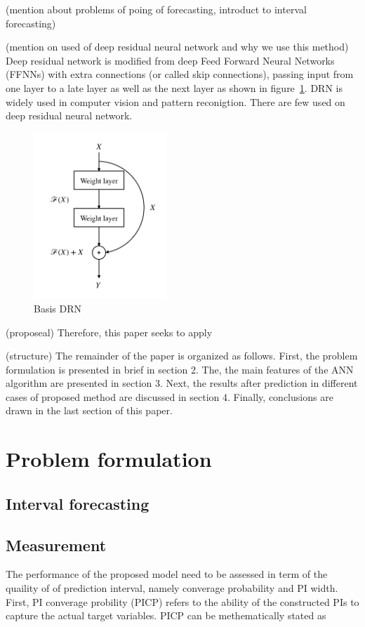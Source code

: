 \documentclass[review]{elsarticle}
\begin{document}
  (mention about problems of poing of forecasting, introduct to interval forecasting)

  (mention on used of deep residual neural network and why we use this method)
  Deep residual network is modified from deep Feed Forward Neural Networks (FFNNs) with extra connections (or called skip connections), passing input from one layer to a late layer as well as the next layer as shown in figure~\ref{Fig:Basic_DRN}. DRN is widely used in computer vision and pattern reconigtion. There are few used on deep residual neural network.

  \begin{figure}[H]
    \caption{Basis DRN}
    \label{Fig:Basic_DRN}
    \includegraphics[width=5cm]{basic_DRN}
  \centering
  \end{figure}


  (proposeal) Therefore, this paper seeks to apply

  (structure) The remainder of the paper is organized as follows. First, the problem formulation is presented in brief in section 2. The, the main features of the ANN algorithm are presented in section 3. Next, the results after prediction in different cases of proposed method  are discussed in section 4. Finally, conclusions are drawn in the last section of this paper.

\section{Problem formulation}

  \subsection{Interval forecasting}

  \subsection{Measurement}
    The performance of the proposed model need to be assessed in term of the quaility of of prediction interval, namely converage probability and PI width. First,  PI converage probility (PICP) refers to the ability of the constructed PIs to capture the actual target variables. PICP can be methematically stated as
\end{document}
